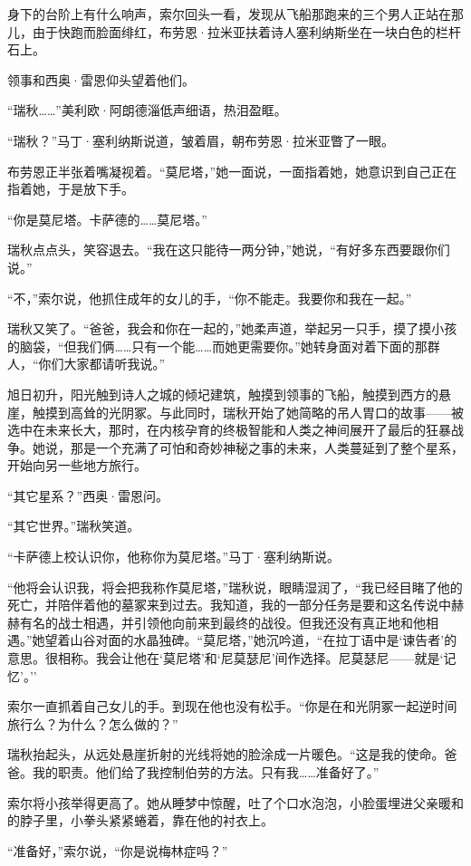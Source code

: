 \documentclass[AutoFakeBold=true]{book}
\begin{document}
身下的台阶上有什么响声，索尔回头一看，发现从飞船那跑来的三个男人正站在那儿，由于快跑而脸面绯红，布劳恩·拉米亚扶着诗人塞利纳斯坐在一块白色的栏杆石上。

领事和西奥·雷恩仰头望着他们。

``瑞秋……''美利欧·阿朗德淄低声细语，热泪盈眶。

``瑞秋？''马丁·塞利纳斯说道，皱着眉，朝布劳恩·拉米亚瞥了一眼。

布劳恩正半张着嘴凝视着。``莫尼塔，''她一面说，一面指着她，她意识到自己正在指着她，于是放下手。

``你是莫尼塔。卡萨德的……莫尼塔。''

瑞秋点点头，笑容退去。``我在这只能待一两分钟，''她说，``有好多东西要跟你们说。''

``不，''索尔说，他抓住成年的女儿的手，``你不能走。我要你和我在一起。''

瑞秋又笑了。``爸爸，我会和你在一起的，''她柔声道，举起另一只手，摸了摸小孩的脑袋，``但我们俩……只有一个能……而她更需要你。''她转身面对着下面的那群人，``你们大家都请听我说。''

旭日初升，阳光触到诗人之城的倾圮建筑，触摸到领事的飞船，触摸到西方的悬崖，触摸到高耸的光阴冢。与此同时，瑞秋开始了她简略的吊人胃口的故事——被选中在未来长大，那时，在内核孕育的终极智能和人类之神间展开了最后的狂暴战争。她说，那是一个充满了可怕和奇妙神秘之事的未来，人类蔓延到了整个星系，开始向另一些地方旅行。

``其它星系？''西奥·雷恩问。

``其它世界。''瑞秋笑道。

``卡萨德上校认识你，他称你为莫尼塔。''马丁·塞利纳斯说。

``他将会认识我，将会把我称作莫尼塔，''瑞秋说，眼睛湿润了，``我已经目睹了他的死亡，并陪伴着他的墓冢来到过去。我知道，我的一部分任务是要和这名传说中赫赫有名的战士相遇，并引领他向前来到最终的战役。但我还没有真正地和他相遇。''她望着山谷对面的水晶独碑。``莫尼塔，''她沉吟道，``在拉丁语中是`谏告者'的意思。很相称。我会让他在`莫尼塔'和`尼莫瑟尼'间作选择。尼莫瑟尼——就是`记忆'。''

索尔一直抓着自己女儿的手。到现在他也没有松手。``你是在和光阴冢一起逆时间旅行么？为什么？怎么做的？''

瑞秋抬起头，从远处悬崖折射的光线将她的脸涂成一片暖色。``这是我的使命。爸爸。我的职责。他们给了我控制伯劳的方法。只有我……准备好了。''

索尔将小孩举得更高了。她从睡梦中惊醒，吐了个口水泡泡，小脸蛋埋进父亲暖和的脖子里，小拳头紧紧蜷着，靠在他的衬衣上。

``准备好，''索尔说，``你是说梅林症吗？''
\end{document}

